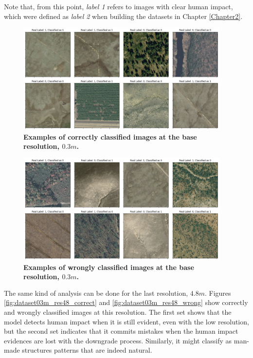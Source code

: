 Note that, from this point, \textit{label 1} refers to images with clear human impact, which were defined as \textit{label 2} when building the datasets in Chapter \ref{Chapter2}.

\begin{figure}[H]
	\centering
	\captionsetup{width=1\linewidth}
	\includegraphics[width=0.95\textwidth]{Figures/results/class_dataset03m_res03_correct.png}
	\caption{\textbf{Examples of correctly classified images at the base resolution, $0.3m$.}}
	\label{fig:dataset03m_res03_correct}
\end{figure}

\begin{figure}[H]
	\centering
	\captionsetup{width=1\linewidth}
	\includegraphics[width=0.95\textwidth]{Figures/results/class_dataset03m_res03_wrong.png}
	\caption{\textbf{Examples of wrongly classified images at the base resolution,  $0.3m$.}}
	\label{fig:dataset03m_res03_wrong}
\end{figure}

The same kind of analysis can be done for the last resolution, $4.8m$. Figures \ref{fig:dataset03m_res48_correct} and \ref{fig:dataset03m_res48_wrong} show correctly and wrongly classified images at this resolution. The first set shows that the model detects human impact when it is still evident, even with the low resolution, but the second set indicates that it commits mistakes when the human impact evidences are lost with the downgrade process. Similarly, it might classify as man-made structures patterns that are indeed natural.

